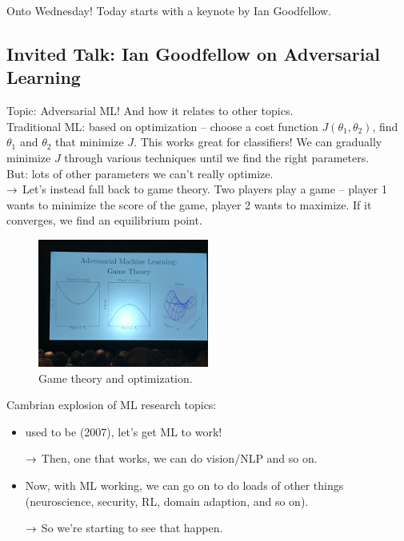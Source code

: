 Onto Wednesday! Today starts with a keynote by Ian Goodfellow. \\

\subsection{Invited Talk: Ian Goodfellow on Adversarial Learning}

Topic: Adversarial ML! And how it relates to other topics. \\

Traditional ML: based on optimization -- choose a cost function $J(\theta_1,\theta_2)$, find $\theta_1$ and $\theta_2$ that minimize $J$. This works great for classifiers! We can gradually minimize $J$ through various techniques until we find the right parameters. \\

But: lots of other parameters we can't really optimize. \\

$\rightarrow$ Let's instead fall back to game theory. Two players play a game -- player 1 wants to minimize the score of the game, player 2 wants to maximize. If it converges, we find an equilibrium point.\\

\begin{figure}
    \centering
    \includegraphics[width=0.5\textwidth]{images/game.JPG}
    \caption{Game theory and optimization.}
    \label{fig:games}
\end{figure}

Cambrian explosion of ML research topics:
\begin{itemize}
    \item used to be (2007), let's get ML to work! 
    
    $\rightarrow$ Then, one that works, we can do vision/NLP and so on.
    
    \item Now, with ML working, we can go on to do loads of other things (neuroscience, security, RL, domain adaption, and so on).
    
    $\rightarrow$ So we're starting to see that happen.
\end{itemize} 

